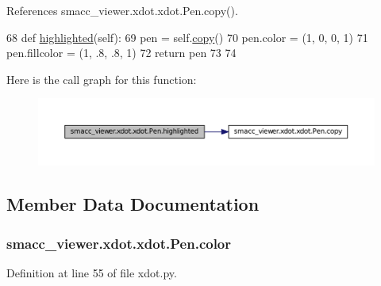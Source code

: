 References smacc\+\_\+viewer.\+xdot.\+xdot.\+Pen.\+copy().


\begin{DoxyCode}
68     \textcolor{keyword}{def }\hyperlink{classsmacc__viewer_1_1xdot_1_1xdot_1_1Pen_a74643889bdfc082589512aebf1e3818e}{highlighted}(self):
69         pen = self.\hyperlink{classsmacc__viewer_1_1xdot_1_1xdot_1_1Pen_a8d65349131e97ab0836ded1e120bec8a}{copy}()
70         pen.color = (1, 0, 0, 1)
71         pen.fillcolor = (1, .8, .8, 1)
72         \textcolor{keywordflow}{return} pen
73 
74 
\end{DoxyCode}


Here is the call graph for this function\+:
\nopagebreak
\begin{figure}[H]
\begin{center}
\leavevmode
\includegraphics[width=350pt]{classsmacc__viewer_1_1xdot_1_1xdot_1_1Pen_a74643889bdfc082589512aebf1e3818e_cgraph}
\end{center}
\end{figure}




\subsection{Member Data Documentation}
\subsubsection[{\texorpdfstring{color}{color}}]{\setlength{\rightskip}{0pt plus 5cm}smacc\+\_\+viewer.\+xdot.\+xdot.\+Pen.\+color}\hypertarget{classsmacc__viewer_1_1xdot_1_1xdot_1_1Pen_a0eb26257c3a85425a3ccb1f320bef4b2}{}\label{classsmacc__viewer_1_1xdot_1_1xdot_1_1Pen_a0eb26257c3a85425a3ccb1f320bef4b2}


Definition at line 55 of file xdot.\+py.


